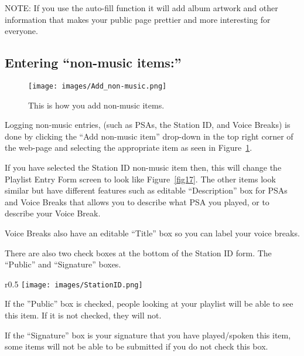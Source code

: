 \documentclass[12pt]{article}
\begin{document}
NOTE: If you use the auto-fill function it will add album artwork and other information that makes your public page prettier and more interesting for everyone.


\subsection{Entering ``non-music items:''}

\begin{figure}[h]
    \centering
    \texttt{[image: images/Add\_non-music.png]}
    \caption{This is how you add non-music items.}
    \label{fig16}
\end{figure}


Logging non-music entries, (such as PSAs, the Station ID, and Voice Breaks) is done by clicking the ``Add non-music item'' drop-down in the top right corner of the web-page and selecting the appropriate item as seen in Figure~\ref{fig16}.


If you have selected the Station ID non-music item then, this will change the Playlist Entry Form screen to look like Figure~\ref{fig17}. 
The other items look similar but have different features such as editable ``Description'' box for PSAs and Voice Breaks that allows you to describe what PSA you played, or to describe your Voice Break. 

Voice Breaks also have an editable ``Title'' box so you can label your voice breaks.

There are also two check boxes at the bottom of the Station ID form. The ``Public'' and ``Signature'' boxes.

\begin{wrapfigure}{r}{0.5\textwidth}
    \texttt{[image: images/StationID.png]}
    \caption{The Station ID non-music item form.}
    \label{fig17}
\end{wrapfigure}

If the ''Public'' box is checked, people looking at your playlist will be able to see this item. If it is not checked, they will not.

If the ``Signature'' box is your signature that you have played/spoken this item, some items will not be able to be submitted if you do not check this box.
\end{document}
